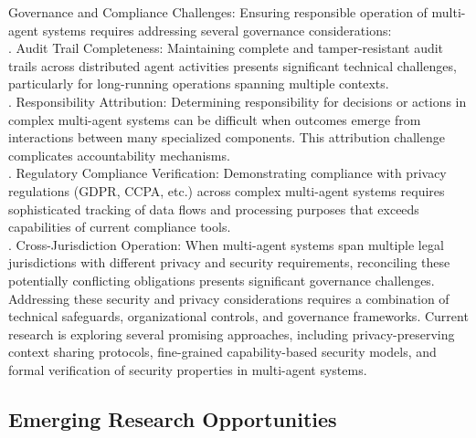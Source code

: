 Governance and Compliance Challenges: Ensuring responsible operation of multi-agent systems requires addressing several governance considerations:\\ . Audit Trail Completeness: Maintaining complete and tamper-resistant audit trails across distributed agent activities presents significant technical challenges, particularly for long-running operations spanning multiple contexts.\\ . Responsibility Attribution: Determining responsibility for decisions or actions in complex multi-agent systems can be difficult when outcomes emerge from interactions between many specialized components. This attribution challenge complicates accountability mechanisms.\\ . Regulatory Compliance Verification: Demonstrating compliance with privacy regulations (GDPR, CCPA, etc.) across complex multi-agent systems requires sophisticated tracking of data flows and processing purposes that exceeds capabilities of current compliance tools.\\ . Cross-Jurisdiction Operation: When multi-agent systems span multiple legal jurisdictions with different privacy and security requirements, reconciling these potentially conflicting obligations presents significant governance challenges.\\ \newline
Addressing these security and privacy considerations requires a combination of technical safeguards, organizational controls, and governance frameworks. Current research is exploring several promising approaches, including privacy-preserving context sharing protocols, fine-grained capability-based security models, and formal verification of security properties in multi-agent systems.\\
\subsection{Emerging Research Opportunities}
